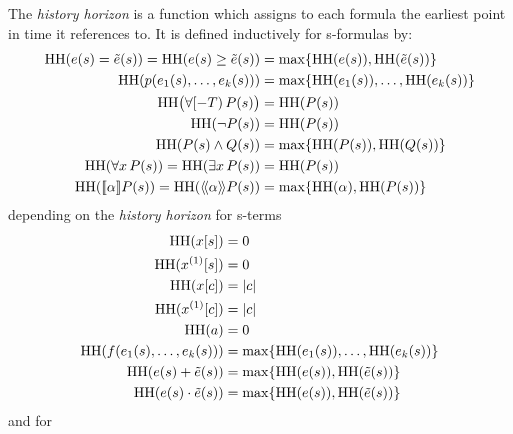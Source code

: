         \begin{definition}
            The \emph{history horizon} is a function
            which
            assigns to each \ddL formula the earliest point in time it references to.
            It is defined inductively for s-formulas by:
            \begin{align*}
                \HH{\astrm(s)=\bstrm(s)} = \HH{\astrm(s)\geq\bstrm(s)} &= \max\set{\HH{\astrm(s)},\HH{\bstrm(s)}}\\
                \HH{p(\range{\istrm{1}(s)}{\istrm{k}(s)})} &= \max\set{\range{\HH{\istrm{1}(s)}}{\HH{\istrm{k}(s)}}}\\
                \HH[\big]{\hs{\asfml(s)}} &= \HH{\asfml(s)}\\
                \HH{\lnot\asfml(s)} &= \HH{\asfml(s)}\\
                \HH{\asfml(s)\land\bsfml(s)} &= \max\set{\HH{\asfml(s)},\HH{\bsfml(s)}}\\
                \HH{\lforall{x}{\asfml(s)}} = \HH{\lexists{x}{\asfml(s)}} &= \HH{\asfml(s)}\\
                \HH{\dbox{\asprg}{\asfml(s)}} = \HH{\ddiamond{\asprg}{\asfml(s)}} &= \max\set{\HH{\asprg},\HH{\asfml(s)}}\\
            \end{align*}
            depending on the \emph{history horizon} for s-terms
            \begin{align*}
                \HH{\x[s]} &= 0\\
                \HH{\Dx[s]} &= 0\\
                \HH{\x[c]} &= \abs{c}\\
                \HH{\Dx[c]} &= \abs{c}\\
                \HH{a} &= 0\\
                \HH{f(\range{\istrm{1}(s)}{\istrm{k}(s)})} &= \max\set{\range{\HH{\istrm{1}(s)}}{\HH{\istrm{k}(s)}}}\\
                \HH{\astrm(s)+\bstrm(s)} &= \max\set{\HH{\astrm(s)},\HH{\bstrm(s)}}\\
                \HH{\astrm(s)\cdot\bstrm(s)} &= \max\set{\HH{\astrm(s)},\HH{\bstrm(s)}}
            \end{align*}
            and for \dHPs
            \begin{align*}

\end{align*}
\end{definition}

